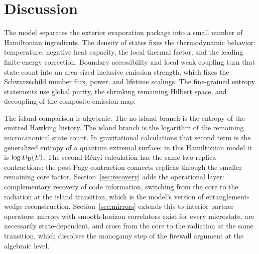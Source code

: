\documentclass[12pt]{article}
\begin{document}
\section{Discussion}
\label{sec:discussion}

The model separates the exterior evaporation package into a small number of
Hamiltonian ingredients.  The density of states fixes the thermodynamic
behavior: temperature, negative heat capacity, the local thermal factor, and
the leading finite-energy correction.  Boundary accessibility and local weak
coupling turn that state count into an area-sized inclusive emission strength,
which fixes the Schwarzschild number flux, power, and lifetime scalings.  The
fine-grained entropy statements use global purity, the shrinking remaining
Hilbert space, and decoupling of the composite emission map.

The island comparison is algebraic.  The no-island branch is the entropy of
the emitted Hawking history.  The island branch is the logarithm of the
remaining microcanonical state count.  In gravitational calculations that
second term is the generalized entropy of a quantum extremal surface; in this
Hamiltonian model it is $\log D_{\rm B}(E)$.  The second R\'enyi calculation
has the same two replica contractions: the post-Page contraction connects
replicas through the smaller remaining core factor.
Section~\ref{sec:recovery} adds the operational layer: complementary
recovery of code information, switching from the core to the radiation at
the island transition, which is the model's version of entanglement-wedge
reconstruction.  Section~\ref{sec:mirrors} extends this to interior partner
operators: mirrors with smooth-horizon correlators exist for every
microstate, are necessarily state-dependent, and cross from the core to the
radiation at the same transition, which dissolves the monogamy step of the
firewall argument at the algebraic level.
\end{document}
